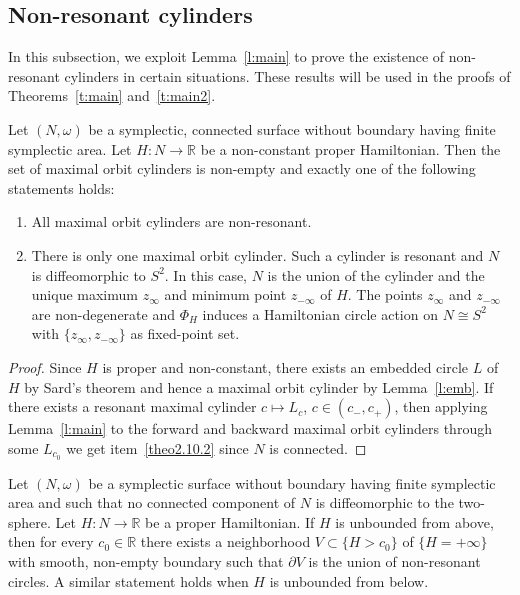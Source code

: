 \documentclass[AHL,Unicode,longabstracts,published]{cedram}
\newcommand{\R}{\mathbb{R}}
\newcommand{\p}{\partial}
\begin{document}
\subsection{Non-resonant cylinders}
In this subsection, we exploit Lemma~\ref{l:main} to prove the existence of non-resonant cylinders in certain situations. These results will be used in the proofs of Theorems~\ref{t:main} and~\ref{t:main2}.

\begin{theo}\label{t:dichotomy}
Let $(N,\omega)$ be a symplectic, connected surface without boundary having finite symplectic area. Let $H:N\to\R$ be a non-constant proper Hamiltonian. Then the set of maximal orbit cylinders is non-empty and exactly one of the following statements holds:
\begin{enumerate}
\item\label{theo2.10.1} All maximal orbit cylinders are non-resonant.
\item\label{theo2.10.2} There is only one maximal orbit cylinder. Such a cylinder is resonant and $N$ is diffeomorphic to $S^2$. In this case, $N$ is the union of the cylinder and the unique maximum $z_\infty$ and minimum point $z_{-\infty}$ of $H$. The points $z_\infty$ and $z_{-\infty}$ are non-degenerate and $\Phi_H$ induces a Hamiltonian circle action on $N\cong S^2$ with $\{z_\infty,z_{-\infty}\}$ as fixed-point set.
\end{enumerate}
\end{theo}


\begin{proof}
Since $H$ is proper and non-constant, there exists an embedded circle $L$ of $H$ by Sard's theorem and hence a maximal orbit cylinder by Lemma~\ref{l:emb}. If there exists a resonant maximal cylinder $c\mapsto L_{c}$, $c\in(c_-,c_+)$, then applying Lemma~\ref{l:main} to the forward and backward maximal orbit cylinders through some $L_{c_0}$ we get item~\eqref{theo2.10.2} since $N$ is connected.
\end{proof}

\begin{theo}\label{t:unbounded}
Let $(N,\omega)$ be a symplectic surface without boundary having finite symplectic area and such that no connected component of $N$ is diffeomorphic to the two-sphere. Let $H:N\to\R$ be a proper Hamiltonian. If $H$ is unbounded from above, then for every $c_0\in\R$ there exists a neighborhood $V\subset \{H> c_0\}$ of $\{H=+\infty\}$ with smooth, non-empty boundary such that $\p V$ is the union of non-resonant circles. A similar statement holds when $H$ is unbounded from below.
\end{theo}
\end{document}
